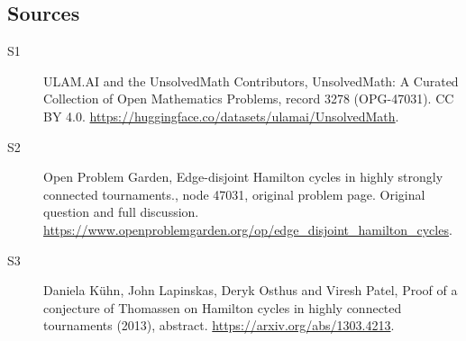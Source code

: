 \documentclass[11pt]{article}
\begin{document}
\subsection{Sources}
\begin{description}
\item[\hypertarget{source:3278:1}{S1}] ULAM.AI and the UnsolvedMath Contributors, UnsolvedMath: A Curated Collection of Open Mathematics Problems, record 3278 (OPG-47031). CC BY 4.0. \url{https://huggingface.co/datasets/ulamai/UnsolvedMath}.
\item[\hypertarget{source:3278:2}{S2}] Open Problem Garden, Edge-disjoint Hamilton cycles in highly strongly connected tournaments., node 47031, original problem page. Original question and full discussion. \url{https://www.openproblemgarden.org/op/edge_disjoint_hamilton_cycles}.
\item[\hypertarget{source:3278:3}{S3}] Daniela Kühn, John Lapinskas, Deryk Osthus and Viresh Patel, Proof of a conjecture of Thomassen on Hamilton cycles in highly connected tournaments (2013), abstract. \url{https://arxiv.org/abs/1303.4213}.
\end{description}
\label{end:3278}
\end{document}
